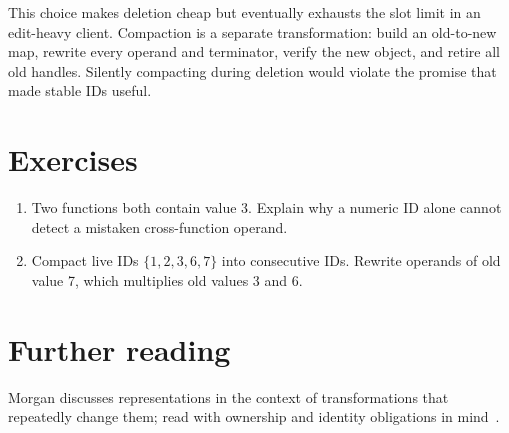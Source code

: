 This choice makes deletion cheap but eventually exhausts the slot limit in an edit-heavy client.
Compaction is a separate transformation: build an old-to-new map, rewrite every operand and terminator, verify the new object, and retire all old handles.
Silently compacting during deletion would violate the promise that made stable IDs useful.

\section{Exercises}
\label{sec:pebble-three-exercises}
\begin{enumerate}
\item \label{ex:pebble-id-owner} Two functions both contain value 3. Explain why a numeric ID alone cannot detect a mistaken cross-function operand.
\item \label{ex:pebble-compact} Compact live IDs $\{1,2,3,6,7\}$ into consecutive IDs. Rewrite operands of old value 7, which multiplies old values 3 and 6.
\end{enumerate}

\section{Further reading}
\label{sec:pebble-three-reading}
Morgan discusses representations in the context of transformations that repeatedly change them; read with ownership and identity obligations in mind~\cite{morgan-1998-optimizing}.
